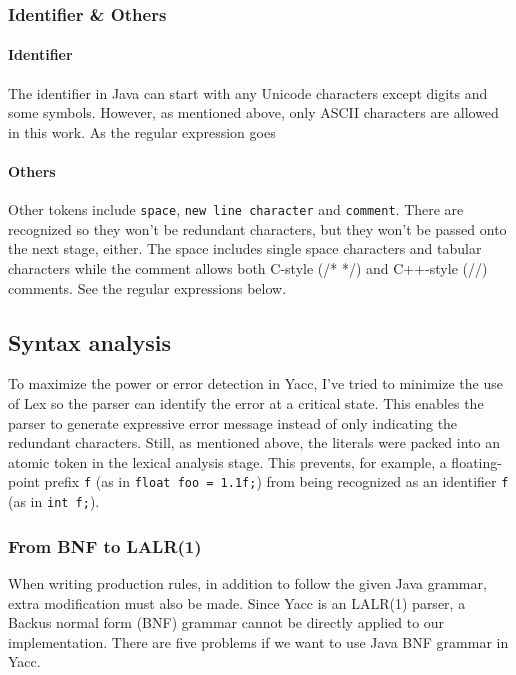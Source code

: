 \documentclass[12pt]{article}
\begin{document}
\subsubsection{Identifier \& Others}
\paragraph{Identifier}
The identifier in Java can start with any Unicode characters except digits and some symbols. However, as mentioned above, only ASCII characters are allowed in this work. As the regular expression goes


\paragraph{Others}
Other tokens include \texttt{space}, \texttt{new line character} and \texttt{comment}. There are recognized so they won't be redundant characters, but they won't be passed onto the next stage, either. The space includes single space characters and tabular characters while the comment allows both C-style (/* */) and C++-style (//) comments. See the regular expressions below.



\subsection{Syntax analysis}
To maximize the power or error detection in Yacc, I've tried to minimize the use of Lex so the parser can identify the error at a critical state. This enables the parser to generate expressive error message instead of only indicating the redundant characters. Still, as mentioned above, the literals were packed into an atomic token in the lexical analysis stage. This prevents, for example, a floating-point prefix \texttt{f} (as in \texttt{float foo = 1.1f;}) from being recognized as an identifier \texttt{f} (as in \texttt{int f;}).

\subsubsection{From BNF to LALR(1)}
When writing production rules, in addition to follow the given Java grammar, extra modification must also be made. Since Yacc is an LALR(1) parser, a Backus normal form (BNF) grammar cannot be directly applied to our implementation. There are five problems if we want to use Java BNF grammar in Yacc.
\end{document}
